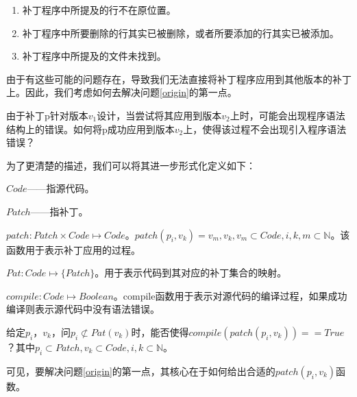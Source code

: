\begin{enumerate}
	\item 补丁程序中所提及的行不在原位置。
	\item 补丁程序中所要删除的行其实已被删除，或者所要添加的行其实已被添加。
	\item 补丁程序中所提及的文件未找到。
\end{enumerate}

由于有这些可能的问题存在，导致我们无法直接将补丁程序应用到其他版本的补丁上。因此，我们考虑如何去解决问题\ref {origin}的第一点。

\begin{problem}
	\label {patch_reversion}
	由于补丁p针对版本$v_{1}$设计，当尝试将其应用到版本$v_{2}$上时，可能会出现程序语法结构上的错误。如何将p成功应用到版本$v_{2}$上，使得该过程不会出现引入程序语法错误？
\end{problem}

为了更清楚的描述，我们可以将其进一步形式化定义如下：

\begin{definition}
	$Code$——指源代码。
\end{definition}

\begin{definition}
	$Patch$——指补丁。
\end{definition}

\begin{definition}
	$patch: Patch \times Code \mapsto Code$。$patch(p_i,v_k) = v_m,v_k,v_m \subset Code,i,k,m \subset \mathbb{N}$。该函数用于表示补丁应用的过程。
\end{definition}

\begin{definition}
	$Pat: Code \mapsto \{Patch\}$。用于表示代码到其对应的补丁集合的映射。
\end{definition}

\begin{definition}
	$compile: Code \mapsto Boolean$。compile函数用于表示对源代码的编译过程，如果成功编译则表示源代码中没有语法错误。
\end{definition}

\begin{problem}
	\label {app_formal}
	给定$p_i$，$v_k$，问$p_i \not \subset Pat(v_k)$时，能否使得$compile(patch(p_i,v_k)) == True$？其中$p_i \subset Patch,v_k \subset Code,i,k \subset \mathbb{N}$。
\end{problem}

可见，要解决问题\ref {origin}的第一点，其核心在于如何给出合适的$patch(p_i,v_k)$函数。

